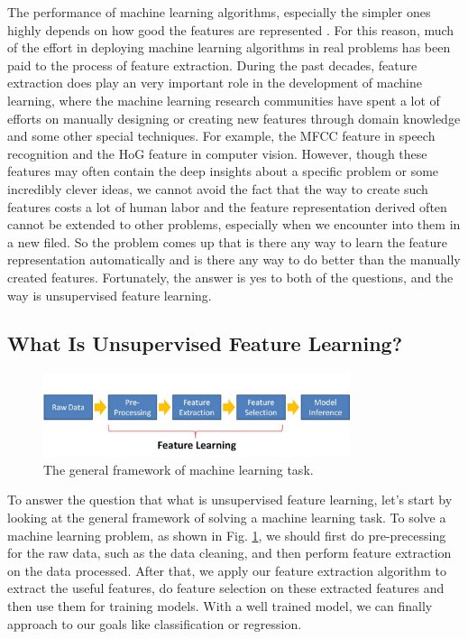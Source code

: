 \documentclass[conference]{IEEEtran}
\begin{document}
The performance of machine learning algorithms, especially the simpler ones  highly depends on how good the features are represented \cite{review}. For this reason, much of the effort in deploying machine learning algorithms in real problems has been paid to the process of feature extraction. During the past decades, feature extraction does play an very important role in the development of machine learning, where the machine learning research communities have spent a lot of efforts on manually designing or creating new features through domain knowledge and some other special techniques. For example, the MFCC feature in speech recognition and the HoG feature in computer vision. However, though these features may often contain the deep insights about a specific problem or some incredibly clever ideas, we cannot avoid the fact that the way to create such features costs a lot of human labor and the feature representation derived often cannot be extended to other problems, especially when we encounter into them in a new filed. So the problem comes up that is there any way to learn the feature representation automatically and is there any way to do better than the manually created features. Fortunately, the answer is yes to both of the questions, and the way is unsupervised feature learning.

\subsection{What Is Unsupervised Feature Learning?}

\begin{figure}[t]
\centering
\includegraphics[width=90mm]{feature_learning.pdf}
\caption{The general framework of machine learning task.}
\label{fig:ml_task}
\end{figure}

To answer the question that what is unsupervised feature learning, let's start by looking at the general framework of solving a machine learning task. To solve a machine learning problem, as shown in Fig. \ref{fig:ml_task}, we should first do pre-precessing for the raw data, such as the data cleaning, and then perform feature extraction on the data processed. After that, we apply our feature extraction algorithm to extract the useful features, do feature selection on these extracted features and then use them for training models. With a well trained model, we can finally approach to our goals like classification or regression.
\end{document}
